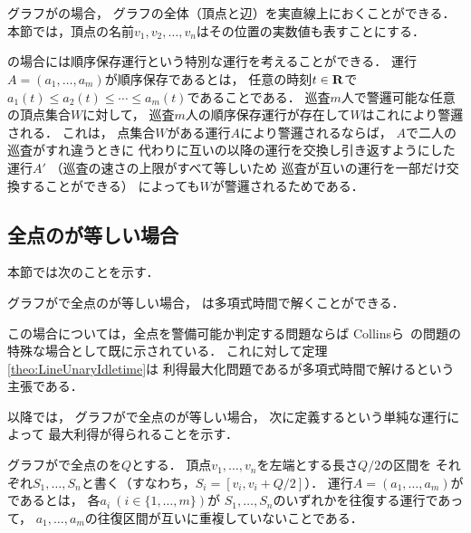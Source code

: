 \section{{\graphLine}}
\label{section: line}

グラフが{\graphLine}の場合，
グラフの全体（頂点と辺）を実直線上におくことができる．
本節では，頂点の名前$v_1, v_2, \ldots, v_n$はその位置の実数値も表すことにする．

{\graphLine}の場合には順序保存運行という特別な運行を考えることができる．
運行$A = (a_1, \ldots, a_m)$が順序保存であるとは，
任意の時刻$t \in \mathbf R$で
$a_1(t) \leq a_2(t) \leq \cdots \leq a_m(t)$であることである．
巡査$m$人で警邏可能な任意の頂点集合$W$に対して，
巡査$m$人の順序保存運行が存在して$W$はこれにより警邏される．
これは，
点集合$W$がある運行$A$により警邏されるならば，
$A$で二人の巡査がすれ違うときに
代わりに互いの以降の運行を交換し引き返すようにした運行$A'$
（巡査の速さの上限がすべて等しいため
巡査が互いの運行を一部だけ交換することができる）
によっても$W$が警邏されるためである．


\subsection{全点の{\maxIdletime}が等しい場合}
\label{subsec:LineUnaryIdletime}


本節では次のことを示す．

\begin{theo}
  \label{theo:LineUnaryIdletime}
  グラフが{\graphLine}で全点の{\maxIdletime}が等しい場合，
  {\patProb}は多項式時間で解くことができる．
\end{theo}

この場合については，全点を警備可能か判定する問題ならば
Collinsら~\cite{collins2013optimal}の問題の特殊な場合として既に示されている．
これに対して定理\ref{theo:LineUnaryIdletime}は
利得最大化問題である{\patProb}が多項式時間で解けるという主張である．

以降では，
グラフが{\graphLine}で全点の{\maxIdletime}が等しい場合，
次に定義する{\indSectOperation}という単純な運行によって
最大利得が得られることを示す．

\begin{defi}
  \label{defi:independentSectionOperation}
  グラフが{\graphLine}で全点の{\maxIdletime}を$Q$とする．
  頂点$v_1, \ldots, v_n$を左端とする長さ$Q/2$の区間を
  それぞれ$S_1, \ldots, S_n$と書く（すなわち，$S_i = [v_i, v_i + Q/2]$）．
  運行$A = (a_1, \ldots, a_m)$が{\indSectOperation}であるとは，
  各$a_i\ (i \in \{ 1, \ldots, m \})$が
  $S_1, \ldots, S_n$のいずれかを往復する運行であって，
  $a_1, \ldots, a_m$の往復区間が互いに重複していないことである．
\end{defi}


